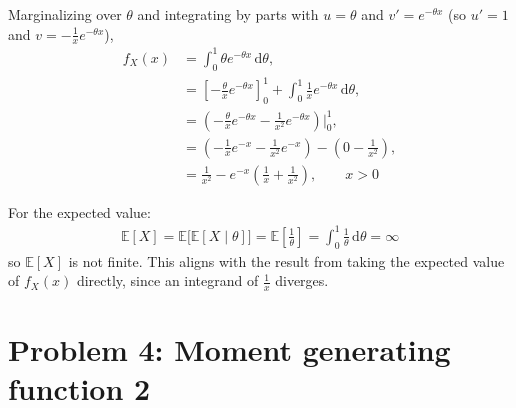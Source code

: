 \documentclass[11pt]{article}
\newcommand{\E}{\mathbb{E}}
\newcommand{\dd}{\,\mathrm{d}}
\begin{document}
Marginalizing over $\theta$ and integrating by parts with $u = \theta$ and $v' = e^{-\theta x}$
(so $u' = 1$ and $v = -\tfrac{1}{x}e^{-\theta x}$),
\begin{align}
  f_X(x) &= \int_0^1 \theta e^{-\theta x}\dd \theta, \\
  &= \left[-\frac{\theta}{x}e^{-\theta x}\right]_0^1 + \int_0^1 \frac{1}{x}e^{-\theta x}\dd\theta, \\
  &= \left(-\frac{\theta}{x}e^{-\theta x} - \frac{1}{x^2}e^{-\theta x}\right)\Bigg|_0^1, \\
  &= \left(-\frac{1}{x}e^{-x} - \frac{1}{x^2}e^{-x}\right) - \left(0 - \frac{1}{x^2}\right), \\
  &= \frac{1}{x^2} - e^{-x}\left(\frac{1}{x} + \frac{1}{x^2}\right), \qquad x > 0
\end{align}

For the expected value:
\begin{align}
  \E[X] = \E\big[\E[X \mid \theta]\big] = \E\!\left[\frac{1}{\theta}\right]
  = \int_0^1 \frac{1}{\theta}\dd\theta = \infty
\end{align}
so $\E[X]$ is not finite. This aligns with the result from taking the expected value of $f_X(x)$ directly, since an integrand of $\tfrac{1}{x}$ diverges.

\section*{Problem 4: Moment generating function 2}
\end{document}
